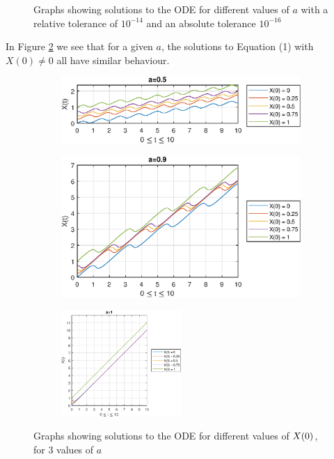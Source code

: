 \documentclass[11pt]{article} %
\let\originalleft\left
\let\originalright\right
\renewcommand{\left}{\mathopen{}\mathclose\bgroup\originalleft}
\renewcommand{\right}{\aftergroup\egroup\originalright}
\begin{document}
\begin{figure}[h]
\begin{subfigure}{0.5\textwidth}
	\end{subfigure}
	\caption{Graphs showing solutions to the ODE for different values of $a$ with a relative tolerance of $10^{-14}$ and an absolute tolerance $10^{-16}$}
	\label{fig:mult_a_high}
\end{figure}
In Figure \ref{fig:mult_x} we see that for a given $a$, the solutions to Equation (1) with $X(0) \neq 0$ all have similar behaviour.
\begin{figure}[H]
	\begin{subfigure}{0.5\textwidth}
		\centering
		\includegraphics[width=1.0\textwidth]{"../Matlab Files/a=05"}
	\end{subfigure}%
	\begin{subfigure}{.5\textwidth}
		\centering
		\includegraphics[width=1.0\textwidth]{"../Matlab Files/a=09"}
	\end{subfigure}
	\begin{subfigure}{\textwidth}
		\centering
		\includegraphics[width=0.5\textwidth]{"../Matlab Files/a=1"}
	\end{subfigure}
	\caption{Graphs showing solutions to the ODE for different values of $X\left(0\right)$, for 3 values of $a$}
	\label{fig:mult_x}
\end{figure}
\end{document}
